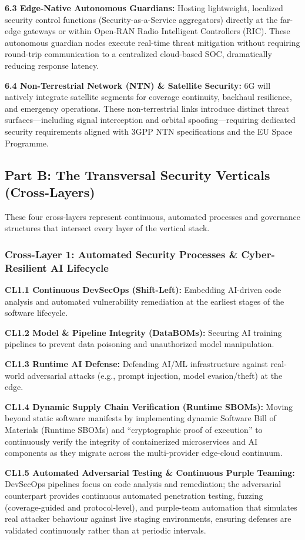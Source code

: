 \documentclass{ieeeaccess}
\begin{document}
\textbf{6.3 Edge-Native Autonomous Guardians:} Hosting lightweight, localized security control functions (Security-as-a-Service aggregators) directly at the far-edge gateways or within Open-RAN Radio Intelligent Controllers (RIC). These autonomous guardian nodes execute real-time threat mitigation without requiring round-trip communication to a centralized cloud-based SOC, dramatically reducing response latency.

\textbf{6.4 Non-Terrestrial Network (NTN) \& Satellite Security:} 6G will natively integrate satellite segments for coverage continuity, backhaul resilience, and emergency operations. These non-terrestrial links introduce distinct threat surfaces---including signal interception and orbital spoofing---requiring dedicated security requirements aligned with 3GPP NTN specifications and the EU Space Programme.

\subsection*{Part B: The Transversal Security Verticals (Cross-Layers)}
These four cross-layers represent continuous, automated processes and governance structures that intersect every layer of the vertical stack.

\subsubsection*{Cross-Layer 1: Automated Security Processes \& Cyber-Resilient AI Lifecycle}
\textbf{CL1.1 Continuous DevSecOps (Shift-Left):} Embedding AI-driven code analysis and automated vulnerability remediation at the earliest stages of the software lifecycle.

\textbf{CL1.2 Model \& Pipeline Integrity (DataBOMs):} Securing AI training pipelines to prevent data poisoning and unauthorized model manipulation.

\textbf{CL1.3 Runtime AI Defense:} Defending AI/ML infrastructure against real-world adversarial attacks (e.g., prompt injection, model evasion/theft) at the edge.

\textbf{CL1.4 Dynamic Supply Chain Verification (Runtime SBOMs):} Moving beyond static software manifests by implementing dynamic Software Bill of Materials (Runtime SBOMs) and ``cryptographic proof of execution'' to continuously verify the integrity of containerized microservices and AI components as they migrate across the multi-provider edge-cloud continuum.

\textbf{CL1.5 Automated Adversarial Testing \& Continuous Purple Teaming:} DevSecOps pipelines focus on code analysis and remediation; the adversarial counterpart provides continuous automated penetration testing, fuzzing (coverage-guided and protocol-level), and purple-team automation that simulates real attacker behaviour against live staging environments, ensuring defenses are validated continuously rather than at periodic intervals.
\end{document}

